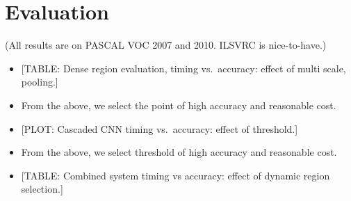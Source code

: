 \section{Evaluation}\label{evaluation}

(All results are on PASCAL VOC 2007 and 2010. ILSVRC is nice-to-have.)

\begin{itemize}
\itemsep1pt\parskip0pt
\item
  {[}TABLE: Dense region evaluation, timing vs.~accuracy: effect of
  multi scale, pooling.{]}
\item
  From the above, we select the point of high accuracy and reasonable
  cost.
\item
  {[}PLOT: Cascaded CNN timing vs.~accuracy: effect of threshold.{]}
\item
  From the above, we select threshold of high accuracy and reasonable
  cost.
\item
  {[}TABLE: Combined system timing vs accuracy: effect of dynamic region
  selection.{]}
\end{itemize}
